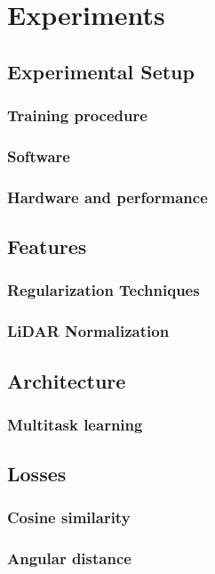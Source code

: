 \chapter{Experiments}%
\label{sec:experiments}

\section{Experimental Setup}
\subsection{Training procedure}
\subsection{Software}
\subsection{Hardware and performance}

\section{Features}


\subsection{Regularization Techniques}%
\label{sec:technique-experiments}


\subsection{LiDAR Normalization}%
\label{sec:normalization-experiment}


\section{Architecture}
\subsection{Multitask learning}


\section{Losses}
\subsection{Cosine similarity}
\subsection{Angular distance}
